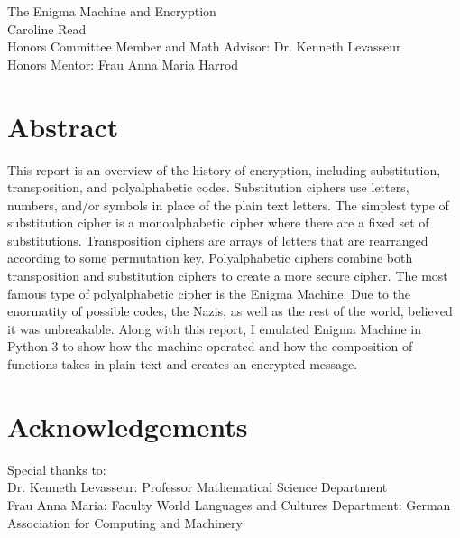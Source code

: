 \documentclass[12pt,letterpaper]{article} %
\begin{document}
\begin{titlepage}
\begin{center}
\vspace*{2in}
The Enigma Machine and Encryption\\
\vspace*{2in}
Caroline Read\\
\vspace*{3in}
Honors Committee Member and Math Advisor: Dr. Kenneth Levasseur\\
Honors Mentor: Frau Anna Maria Harrod
\vspace{.5in}
\end{center}
\end{titlepage}

\newpage

\tableofcontents

\newpage

\section{Abstract}

This report  is an overview of the history of encryption, including substitution, transposition, and polyalphabetic codes. Substitution ciphers use letters, numbers, and/or symbols in place of the plain text letters.  The simplest type of substitution cipher is a monoalphabetic cipher where there are a fixed set of substitutions.  Transposition ciphers are arrays of letters that are rearranged according to some permutation key.  Polyalphabetic ciphers combine both transposition and substitution ciphers to create a more secure cipher. The most famous type of polyalphabetic cipher is the Enigma Machine.  Due to the enormatity of possible codes, the Nazis, as well as the rest of the world, believed it was unbreakable. Along with this report, I emulated Enigma Machine in Python 3 to show how the machine operated and how the composition of functions takes in plain text and creates an encrypted message. 

\newpage   
\section{Acknowledgements}
Special thanks to:
\\Dr. Kenneth Levasseur: Professor Mathematical Science Department
\\Frau Anna Maria: Faculty World Languages and Cultures Department: German 
\\Association for Computing and Machinery
\newpage
\end{document}
